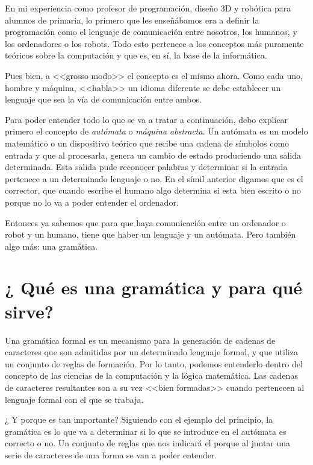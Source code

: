 
En mi experiencia como profesor de programación, diseño 3D y robótica para alumnos de primaria, lo primero que les enseñábamos era a definir la programación como el lenguaje de comunicación entre nosotros, los humanos, y los ordenadores o los robots. Todo esto pertenece a los conceptos más puramente teóricos sobre la computación y que es, en sí, la base de la informática. 

Pues bien, a <<grosso modo>> el concepto es el mismo ahora. Como cada uno, hombre y máquina, <<habla>> un idioma diferente se debe establecer un lenguaje que sea la vía de comunicación entre ambos. 

Para poder entender todo lo que se va a tratar a continuación, debo explicar primero el concepto de \textit{autómata} o \textit{máquina abstracta}. Un autómata es un modelo matemático o un dispositivo teórico que recibe una cadena de símbolos como entrada y que al procesarla, genera un cambio de estado produciendo una salida determinada. Esta salida pude reconocer palabras y determinar si la entrada pertenece a un determinado lenguaje o no. En el símil anterior digamos que es el corrector, que cuando escribe el humano algo determina si esta bien escrito o no porque no lo va a poder entender el ordenador. 

Entonces ya sabemos que para que haya comunicación entre un ordenador o robot y un humano, tiene que haber un lenguaje y un autómata. Pero también algo más: una gramática.

\section{¿ Qué es una gramática y para qué sirve?}

Una gramática formal es un mecanismo para la generación de cadenas de caracteres que son admitidas por un determinado lenguaje formal, y que utiliza un conjunto de reglas de formación. Por lo tanto, podemos entenderlo dentro del concepto de las ciencias de la computación y la lógica matemática. Las cadenas de caracteres resultantes son a su vez <<bien formadas>> cuando pertenecen al lenguaje formal con el que se trabaja.\cite{aho1986compilers}

¿ Y porque es tan importante? Siguiendo con el ejemplo del principio, la gramática es lo que va a determinar si lo que se introduce en el autómata es correcto o no. Un conjunto de reglas que nos indicará el porque al juntar una serie de caracteres de una forma se van a poder entender.

